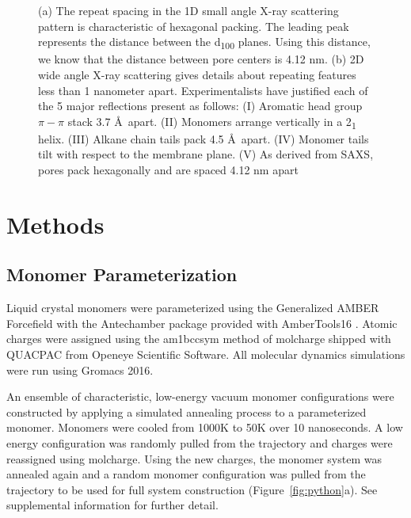 \documentclass{article}
\begin{document}
\begin{figure}
\begin{subfigure}[t]{0.47\linewidth}
                \caption{}\label{fig:WAXS}
        \end{subfigure}
	\caption{(a) The repeat spacing in the 1D small angle X-ray scattering pattern
		is characteristic of hexagonal packing. The leading peak represents the
		distance between the d\textsubscript{100} planes. Using this distance, we know
		that the distance between pore centers is 4.12 nm. (b) 2D wide angle X-ray
		scattering gives details about repeating features less than 1 nanometer
		apart. Experimentalists have justified each of the 5 major reflections
		present as follows: (I) Aromatic head group $\pi-\pi$ stack 3.7 \AA~apart.
		(II) Monomers arrange vertically in a 2\textsubscript{1} helix. (III) Alkane
 		chain tails pack 4.5 \AA~apart. (IV) Monomer tails tilt with respect to the 
 		membrane plane. (V) As derived from SAXS, pores pack hexagonally and are 
		spaced 4.12 nm apart}
	\label{fig:SWAXS}
 \end{figure}

  \section{Methods}
 
  \subsection{Monomer Parameterization}

  Liquid crystal monomers were parameterized using the Generalized AMBER
  Forcefield \cite{wang_development_2004} with the Antechamber package
  \cite{wang_automatic_2006} provided with AmberTools16
  \cite{case_ambertools16_2016}. Atomic charges were assigned using the am1bccsym
  method of molcharge shipped with QUACPAC from Openeye Scientific Software. All
  molecular dynamics simulations were run using Gromacs 2016.
  \cite{bekker_gromacs:_1993,berendsen_gromacs:_1995,van_der_spoel_gromacs:_2005,hess_gromacs_2008}

  An ensemble of characteristic, low-energy vacuum monomer configurations
  were constructed by applying a simulated annealing process to a parameterized
  monomer. Monomers were cooled from 1000K to 50K over 10 nanoseconds.  A low
  energy configuration was randomly pulled from the trajectory and charges were
  reassigned using molcharge.
  Using the new charges, the monomer system was
  annealed again and a random monomer configuration was pulled from the
  trajectory to be used for full system construction (Figure~\ref{fig:python}a).
  See supplemental information for further detail.
\end{document}
